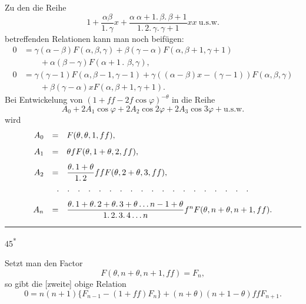 \clearpage\NoSourceHead{}
\noindent{\small[S. 289]}\par
{}
\noindent\hspace*{\parindent}Zu den die Reihe
\[
1+\frac{\alpha\beta}{1{.}\,\gamma}x+\frac{\alpha\ \alpha+1{.}\,\beta{.}\,\beta+1}{1{.}\,2{.}\,\gamma{.}\,\gamma+1}xx\ \text{u.s.w.}
\]
\noindent betreffenden Relationen kann man noch beifügen:
\[
\begin{aligned}
0&=\gamma(\alpha-\beta)F(\alpha,\beta,\gamma)+\beta(\gamma-\alpha)F(\alpha,\beta+1,\gamma+1)\\[.5em]
&\qquad+\alpha(\beta-\gamma)F(\alpha+1\mathpunct{.}\,\beta,\gamma),\\[.9em]
0&=\gamma(\gamma-1)F(\alpha,\beta-1,\gamma-1)+\gamma((\alpha-\beta)x-(\gamma-1))F(\alpha,\beta,\gamma)\\[.5em]
&\qquad+\beta(\gamma-\alpha)xF(\alpha,\beta+1,\gamma+1).
\end{aligned}
\]
\noindent\hspace*{\parindent}Bei Entwickelung von $(1+ff-2f\cos\varphi)^{-\theta}$ in die Reihe
\[
A_0+2A_1\cos\varphi+2A_2\cos2\varphi+2A_3\cos3\varphi+\text{u.s.w.}
\]
\noindent wird
\[
\begin{array}{rcl}
A_0&=&F(\theta,\theta,1,ff),\\[.8em]
A_1&=&\theta f F(\theta,1+\theta,2,ff),\\[.8em]
A_2&=&\displaystyle\frac{\theta{.}\,1+\theta}{1{.}\,2}ff F(\theta,2+\theta,3,ff),\\[.8em]
\multicolumn{3}{c}{{.}\quad{.}\quad{.}\quad{.}\quad{.}\quad{.}\quad{.}\quad{.}\quad{.}\quad{.}\quad{.}\quad{.}\quad{.}\quad{.}\quad{.}\quad{.}\quad{.}\quad{.}\quad{.}}\\[.8em]
A_n&=&\displaystyle\frac{\theta{.}\,1+\theta{.}\,2+\theta{.}\,3+\theta\,{.}\,{.}\,{.}\,n-1+\theta}{1{.}\,2{.}\,3{.}\,4\,{.}\,{.}\,{.}\,n}f^nF(\theta,n+\theta,n+1,ff).
\end{array}
\]
\par\medskip\noindent\rule{.25\linewidth}{.4pt}\par\smallskip
{\small{}\par}
\par\bigskip\hfill45\textsuperscript{*}\par
\clearpage{}
\noindent\hspace*{\parindent}Setzt man den Factor
\[
F(\theta,n+\theta,n+1,ff)=F_n,
\]
\noindent so gibt die [zweite] obige Relation
\[
0=n(n+1)\{F_{n-1}-(1+ff)F_n\}+(n+\theta)(n+1-\theta)ffF_{n+1}.
\]
\clearpage
